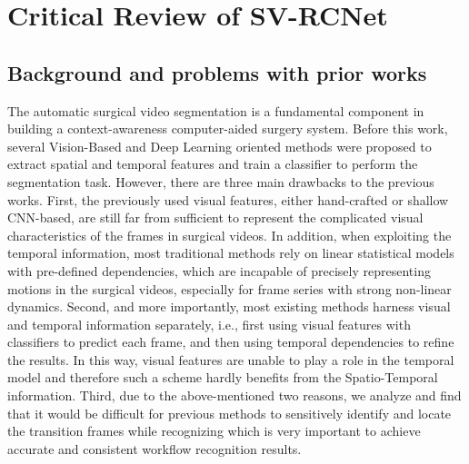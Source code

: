 \documentclass[11pt]{article} \usepackage[top=1in, bottom=1in, left=1in, right=1in]{geometry}
\begin{document}
\section{Critical Review of SV-RCNet}
\subsection{Background and problems with prior works}
The automatic surgical video segmentation is a fundamental component in building a context-awareness computer-aided surgery system.  Before this work, several Vision-Based and Deep Learning oriented methods were proposed to extract spatial and temporal features and train a classifier to perform the segmentation task. However, there are three main drawbacks to the previous works.  First, the previously used visual features, either hand-crafted or shallow CNN-based, are still far from sufficient to represent the complicated visual characteristics of the frames in surgical videos. In addition, when exploiting the temporal information, most traditional methods rely on linear statistical models with pre-defined dependencies, which are incapable of precisely representing motions in the surgical videos, especially for frame series with strong non-linear dynamics. Second, and more importantly, most existing methods harness visual and temporal information separately, i.e., first using visual features with classifiers to predict each frame, and then using temporal dependencies to refine the results. In this way, visual features are unable to play a role in the temporal model and therefore such a scheme hardly benefits from the Spatio-Temporal information. Third, due to the above-mentioned two reasons, we analyze and find that it would be difficult for previous methods to sensitively identify and locate the transition frames while recognizing which is very important to achieve accurate and consistent workflow recognition results. \cite{SV-RCNet}
\end{document}
